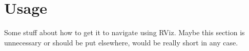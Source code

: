 \chapter{Usage}
\label{chap:usage}

Some stuff about how to get it to navigate using RViz. Maybe this section is unnecessary or should be put elsewhere, would be really short in any case.

